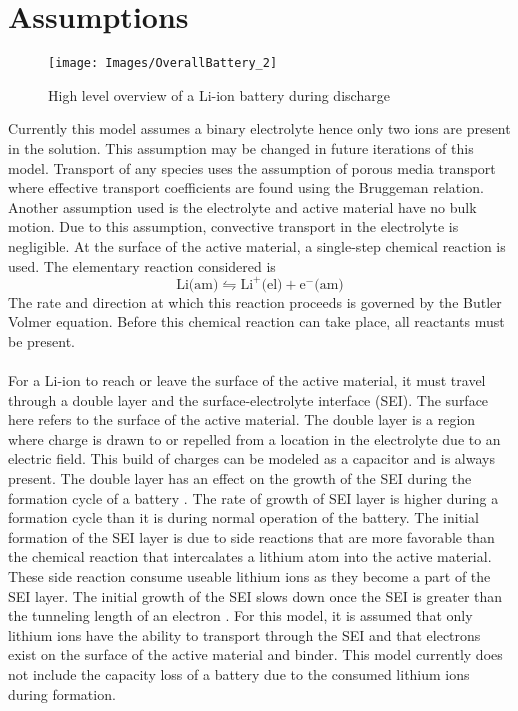 \documentclass[12pt]{article}
\begin{document}
\section{Assumptions} \label{sec:Assumptions}
	\begin{figure} [h]
		\centering
		\texttt{[image: Images/OverallBattery\_2]}
		\caption{High level overview of a Li-ion battery during discharge}
		\label{fig:Overall_Battery}
	\end{figure}
	Currently this model assumes a binary electrolyte hence only two ions are present in the solution. This assumption may be changed in future iterations of this model. Transport of any species uses the assumption of porous media transport where effective transport coefficients are found using the Bruggeman relation. Another assumption used is the electrolyte and active material have no bulk motion. Due to this assumption, convective transport in the electrolyte is negligible. At the surface of the active material, a single-step chemical reaction is used. The elementary reaction considered is
	\begin{equation} \label{eqn:elementary_rxn}
		\textrm{Li(am)} \leftrightharpoons \textrm{Li}^+ \textrm{(el)} + \textrm{e}^- \textrm{(am)}
	\end{equation}
	The rate and direction at which this reaction proceeds is governed by the Butler Volmer equation. Before this chemical reaction can take place, all reactants must be present. \\ 
	\\
	For a Li-ion to reach or leave the surface of the active material, it must travel through a double layer and the surface-electrolyte interface (SEI). The surface here refers to the surface of the active material. The double layer is a region where charge is drawn to or repelled from a location in the electrolyte due to an electric field. This build of charges can be modeled as a capacitor and is always present. The double layer has an effect on the growth of the SEI during the formation cycle of a battery \cite{MFLNKEB20}. The rate of growth of SEI layer is higher during a formation cycle than it is during normal operation of the battery. The initial formation of the SEI layer is due to side reactions that are more favorable than the chemical reaction that intercalates a lithium atom into the active material. These side reaction consume useable lithium ions as they become a part of the SEI layer. The initial growth of the SEI slows down once the SEI is greater than the tunneling length of an electron \cite{ZSYZWRCXBDBWXXWZ20}. For this model, it is assumed that only lithium ions have the ability to transport through the SEI and that electrons exist on the surface of the active material and binder. This model currently does not include the capacity loss of a battery due to the consumed lithium ions during formation.\\ 
\end{document}
